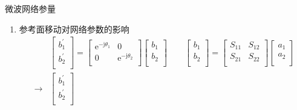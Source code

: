 \begin{frame}{微波网络参量}
    \begin{enumerate}
        \resume
        \item 参考面移动对网络参数的影响\\
              \begin{align*}
                   & \begin{bmatrix*}
                         b_1^{'} \\
                         b_2^{'} \\
                     \end{bmatrix*}
                  =
                  \begin{bmatrix*}
                      \mathrm{e}^{-\mathrm{j}\theta_1} & 0 \\
                      0 & \mathrm{e}^{-\mathrm{j}\theta_2} \\
                  \end{bmatrix*}
                  \begin{bmatrix*}
                      b_1 \\
                      b_2 \\
                  \end{bmatrix*}
                  \qquad
                  \begin{bmatrix*}
                      b_1 \\
                      b_2 \\
                  \end{bmatrix*}
                  =
                  \begin{bmatrix*}
                      S_{11} & S_{12} \\
                      S_{21} & S_{22} \\
                  \end{bmatrix*}
                  \begin{bmatrix*}
                      a_1 \\
                      a_2 \\
                  \end{bmatrix*}    \\
                  \rightarrow
                   & \begin{bmatrix*}
                         b_1^{'} \\
                         b_2^{'} \\
                     \end{bmatrix*}

\end{align*}
\end{enumerate}
\end{frame}

